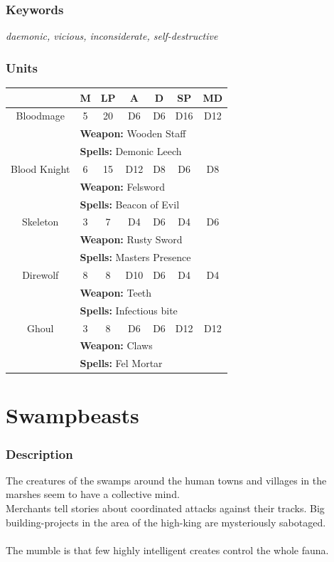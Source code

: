 \documentclass[a5paper,pagesize,10pt,bibtotoc,pointlessnumbers,
normalheadings,DIV=9,twoside=false]{scrbook}
\begin{document}
\subsubsection{Keywords}
\emph{daemonic, vicious, inconsiderate, self-destructive}

\subsubsection{Units}
 \begin{tabular}{||c c c c c c c||} 
 \hline
  & M & LP & A & D & SP & MD \\
 \hline\hline
 Bloodmage & 5 & 20 & D6 & D6 & D16 & D12 \\ 
  & \multicolumn{6}{l||}{\textbf{Weapon:} Wooden Staff} \\
  & \multicolumn{6}{l||}{\textbf{Spells:} Demonic Leech} \\
 \hline
 Blood Knight & 6 & 15 & D12 & D8 & D6 & D8 \\
  & \multicolumn{6}{l||}{\textbf{Weapon:} Felsword} \\
  & \multicolumn{6}{l||}{\textbf{Spells:} Beacon of Evil} \\
 \hline
 Skeleton & 3 & 7 & D4 & D6 & D4 & D6 \\
  & \multicolumn{6}{l||}{\textbf{Weapon:} Rusty Sword} \\
  & \multicolumn{6}{l||}{\textbf{Spells:} Masters Presence} \\
\hline
 Direwolf & 8 & 8 & D10 & D6 & D4 & D4 \\
  & \multicolumn{6}{l||}{\textbf{Weapon:} Teeth} \\
  & \multicolumn{6}{l||}{\textbf{Spells:} Infectious bite} \\
\hline
Ghoul & 3 & 8 & D6 & D6 & D12 & D12 \\
  & \multicolumn{6}{l||}{\textbf{Weapon:} Claws} \\
  & \multicolumn{6}{l||}{\textbf{Spells:} Fel Mortar} \\
\hline
\end{tabular}

\newpage
\section{Swampbeasts}

\subsubsection{Description}
The creatures of the swamps around the human towns and villages in the marshes seem to have a collective mind.\\
Merchants tell stories about coordinated attacks against their tracks. Big building-projects in the area of the high-king are mysteriously sabotaged.\\
\\
The mumble is that few highly intelligent creates control the whole fauna.
\end{document}
